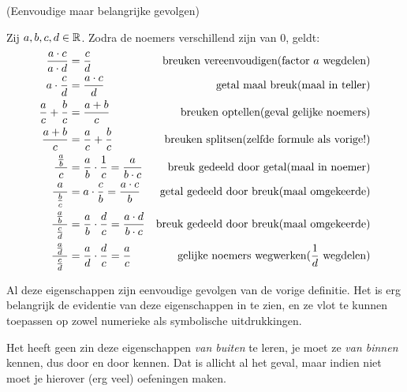 \documentclass[numbers]{ximera}
\begin{document}
\begin{proposition} (Eenvoudige maar belangrijke gevolgen)
	
	Zij $a,b,c,d\in \mathbb{R}$. Zodra de noemers verschillend zijn van $0$, geldt:
\begin{align*}
		\frac{a\cdot c}{a\cdot d} &= \frac{c}{d} 
			& \text{breuken vereenvoudigen} \hfill\text{(factor $a$ wegdelen)} \\
		a\cdot \frac{c}{d}   &= \frac{a\cdot c}{d} 
			& \text{getal maal breuk}\hfill \text{(maal in teller)} \\
		\frac{a}{c}+\frac{b}{c}  &= \frac{a+b}{c} 
			& \text{breuken optellen}\hfill\text{(geval gelijke noemers)} \\
		\frac{a+b}{c} &= \frac{a}{c}+\frac{b}{c}  
			& \text{breuken splitsen} \hfill\text{(zelfde formule als vorige!)}\\
		\frac{\frac{a}{b}}{\ c\ } &= \frac ab \cdot \frac 1c = \frac{a}{b\cdot c} 
		& \text{breuk gedeeld door getal}\hfill\text{(maal in noemer)}\\
		\frac{a}{\ \frac{b}{c}\ } &= a\cdot \frac cb = \frac{a\cdot c}{b}
		& \text{getal gedeeld door breuk}\hfill\text{(maal omgekeerde)}\\
		\frac{\frac{a}{b}}{\ \frac{c}{d}\ } &= \frac ab \cdot \frac dc =  \frac{a\cdot d}{b\cdot c}
		& \text{breuk gedeeld door breuk}\hfill\text{(maal omgekeerde)}\\
		\frac{\frac{a}{d}}{\ \frac{c}{d}\ } &= \frac ad \cdot \frac dc =  \frac{a}{c}
		& \text{gelijke noemers wegwerken}\hfill\text{($\frac 1d$ wegdelen)}\\
		\end{align*}
\end{proposition}


Al deze eigenschappen zijn eenvoudige gevolgen van de vorige definitie. Het is erg belangrijk de evidentie van deze eigenschappen in te zien, en ze vlot te kunnen toepassen op zowel numerieke als symbolische uitdrukkingen.

Het heeft geen zin deze eigenschappen \textit{van buiten} te leren, je moet ze \textit{van binnen} kennen, dus door en door kennen. Dat is allicht al het geval, maar indien niet moet je hierover (erg veel) oefeningen maken.
\end{document}
